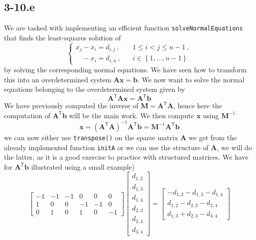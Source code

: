 \documentclass{article}
\begin{document}
\subsection*{3-10.e}
We are tasked with implementing an efficient function \verb|solveNormalEquations| that finds the least-squares solution of
\begin{equation*}
    \begin{cases}
    x_{j}-x_{i} = d_{i,j}\,,\quad &1 \leq i < j \leq n - 1\,,\\
    \phantom{x_{j}}-x_{i} = d_{i,n}\,,&i\in\left\{1, \dots, n-1\right\}
    \end{cases}
\end{equation*}
by solving the corresponding normal equations. We have seen how to transform this into an overdetermined system $\mathbf{A}\mathbf{x} = \mathbf{b}$. We now want to solve the normal equations belonging to the overdetermined system given by
\begin{equation*}
    \mathbf{A}^{\mathsf{T}}\mathbf{A}\mathbf{x} = \mathbf{A}^{\mathsf{T}}\mathbf{b}
\end{equation*}
We have previously computed the inverse of $\mathbf{M} = \mathbf{A}^{\mathsf{T}}\mathbf{A}$, hence here the computation of $\mathbf{A}^{\mathsf{T}}\mathbf{b}$ will be the main work. We then compute $\mathbf{x}$ using $\mathbf{M}^{-1}$
\begin{equation*}
    \mathbf{x} = \left(\mathbf{A}^{\mathsf{T}}\mathbf{A}\right)^{-1}\mathbf{A}^{\mathsf{T}}\mathbf{b} = \mathbf{M}^{-1}\mathbf{A}^{\mathsf{T}}\mathbf{b}
\end{equation*}
we can now either use \verb|transpose()| on the sparse matrix $\mathbf{A}$ we get from the already implemented function \verb|initA| or we can use the structure of $\mathbf{A}$, we will do the latter, as it is a good exercise to practice with structured matrices. We have for $\mathbf{A}^{\mathsf{T}}\mathbf{b}$ illustrated using a small example)
\begin{equation*}
    \begin{bmatrix}
        -1 & -1 & -1 & 0 & 0 & 0 \\
        1 & 0 & 0 & -1 & -1 & 0 \\
        0 & 1 & 0 & 1 & 0 & -1
    \end{bmatrix}\begin{bmatrix}
        d_{1,2} \\
        d_{1,3} \\
        d_{1,4} \\
        d_{2,3} \\
        d_{2,4} \\
        d_{3,4}
    \end{bmatrix} = \begin{bmatrix}
        -d_{1,2} -d_{1,3} - d_{1,4} \\
        d_{1,2} -d_{2,3} - d_{2,4} \\
        d_{1,3} +d_{2,3} -d_{3,4}
    \end{bmatrix}
\end{equation*}
\end{document}
